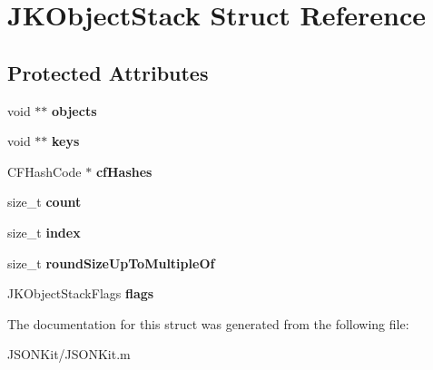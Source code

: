 \hypertarget{struct_j_k_object_stack}{\section{J\+K\+Object\+Stack Struct Reference}
\label{struct_j_k_object_stack}
}
\subsection*{Protected Attributes}
\begin{DoxyCompactItemize}
\item 
\hypertarget{struct_j_k_object_stack_a05d0aaccbbd97c2d2d9e21103a0f0674}{void $\ast$$\ast$ {\bfseries objects}}\label{struct_j_k_object_stack_a05d0aaccbbd97c2d2d9e21103a0f0674}

\item 
\hypertarget{struct_j_k_object_stack_ab68ecf2c44e86aa7a610a3f62569027d}{void $\ast$$\ast$ {\bfseries keys}}\label{struct_j_k_object_stack_ab68ecf2c44e86aa7a610a3f62569027d}

\item 
\hypertarget{struct_j_k_object_stack_a1182bd031d894877fe2a7963a5d857ce}{C\+F\+Hash\+Code $\ast$ {\bfseries cf\+Hashes}}\label{struct_j_k_object_stack_a1182bd031d894877fe2a7963a5d857ce}

\item 
\hypertarget{struct_j_k_object_stack_a41f8a4ef732a6871e2bf2527c063e97d}{size\+\_\+t {\bfseries count}}\label{struct_j_k_object_stack_a41f8a4ef732a6871e2bf2527c063e97d}

\item 
\hypertarget{struct_j_k_object_stack_a2ed7166eb043cc62224f829700bbf7e5}{size\+\_\+t {\bfseries index}}\label{struct_j_k_object_stack_a2ed7166eb043cc62224f829700bbf7e5}

\item 
\hypertarget{struct_j_k_object_stack_ac0eac91125386d09f4d4834fdeed6356}{size\+\_\+t {\bfseries round\+Size\+Up\+To\+Multiple\+Of}}\label{struct_j_k_object_stack_ac0eac91125386d09f4d4834fdeed6356}

\item 
\hypertarget{struct_j_k_object_stack_ad2a26b250c96005e28cda8d2d493dfbe}{J\+K\+Object\+Stack\+Flags {\bfseries flags}}\label{struct_j_k_object_stack_ad2a26b250c96005e28cda8d2d493dfbe}

\end{DoxyCompactItemize}


The documentation for this struct was generated from the following file\+:\begin{DoxyCompactItemize}
\item 
J\+S\+O\+N\+Kit/J\+S\+O\+N\+Kit.\+m\end{DoxyCompactItemize}
